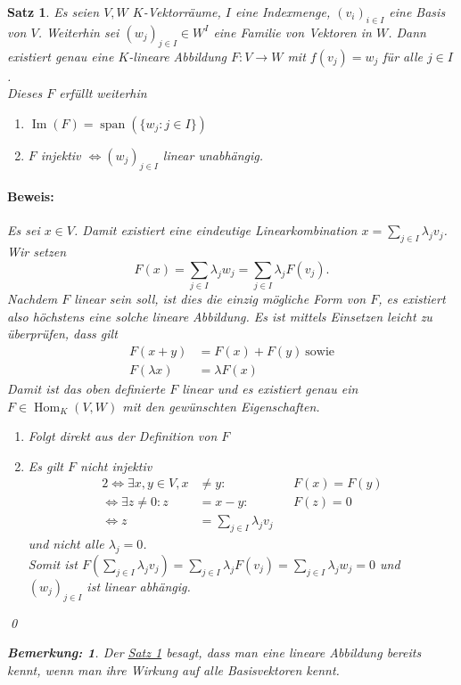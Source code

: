 \documentclass{report}
\newcommand{\lb}{\lambda}
\DeclareMathOperator{\Span}{span}
\DeclareMathOperator{\Hom}{Hom}
\DeclareMathOperator{\Ima}{Im}
\theoremstyle{customrem}
\newtheorem*{bemerkung}{Bemerkung\textnormal:}
\theoremstyle{customdef}
\newtheorem{satz}[definition]{Satz}
\renewenvironment{proof}{\paragraph{Beweis: }}{\qed}
\theoremstyle{customenv}
\begin{document}
	\begin{satz}
		\label{satz33}
		Es seien \(V, W\) \(K\)-Vektorräume, \(I\) eine Indexmenge, \((v_i)_{i \in I}\) eine Basis von \(V\). Weiterhin sei \((w_j)_{j \in I} \in W^I\) eine Familie von Vektoren in \(W\). Dann existiert genau eine \(K\)-lineare Abbildung \(F : V \to W\) mit \(f(v_j) = w_j\) für alle \(j \in I\).\\

		 Dieses \(F\) erfüllt weiterhin
		\begin{enumerate}[leftmargin = 4cm]
			\item \(\Ima(F) = \Span(\{w_j : j \in I\})\)
			\item \(F\) injektiv \(\iff (w_j)_{j \in I}\) linear unabhängig.
		\end{enumerate}

		\begin{proof}
			Es sei \(x \in V\). Damit existiert eine eindeutige Linearkombination \(x = \sum_{j \in I} \lb_j v_j\). Wir setzen \[F(x) = \sum_{j \in I}\lb_jw_j = \sum_{j \in I} \lb_jF(v_j).\] Nachdem \(F\) linear sein soll, ist dies die einzig mögliche Form von \(F\), es existiert also höchstens eine solche lineare Abbildung. Es ist mittels Einsetzen leicht zu überprüfen, dass gilt
			\begin{align*}
			F(x + y) &= F(x) + F(y)\ \text{sowie}\\
			F(\lb x) &= \lb F(x)
			\end{align*}
			Damit ist das oben definierte \(F\) linear und es existiert genau ein \(F \in \Hom_K(V, W)\) mit den gewünschten Eigenschaften.
			\begin{enumerate}[leftmargin=2cm]
				\item[Zu 1.:]Folgt direkt aus der Definition von \(F\)
				\item[Zu 2.:]Es gilt \(F\) nicht injektiv
				\begin{alignat*}{2}
				\iff \exists x, y \in V, x &\neq y : && F(x) = F(y)\\
				\iff \exists z \neq 0 : z &= x - y : && F(z) = 0\\
				\iff z &= \sum_{j \in I} \lb_j v_j
				\end{alignat*}
				und nicht alle \(\lb_j = 0\).\\
				Somit ist \(F\left(\sum_{j \in I}\lb_j v_j\right) = \sum_{j \in I} \lb_j F(v_j) = \sum_{j \in I} \lb_j w_j = 0\) und \((w_j)_{j \in I}\) ist linear abhängig.\\
			\end{enumerate}
		\end{proof}

		\begin{bemerkung}
			Der \hyperref[satz33]{Satz \ref*{satz33}} besagt, dass man eine lineare Abbildung bereits kennt, wenn man ihre Wirkung auf alle Basisvektoren kennt.
		\end{bemerkung}
	\end{satz}
\end{document}
